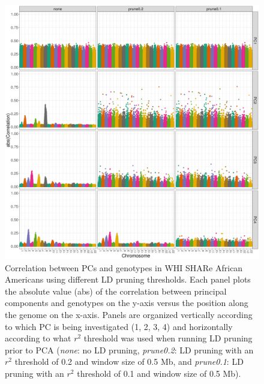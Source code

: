 \documentclass[12pt]{article}
\begin{document}
\begin{figure}[!htb]
\center
\includegraphics[width=\textwidth]{figs/pc_geno_corr/pc_geno_corr_compare_prune}
\caption{Correlation between PCs and genotypes in WHI SHARe African Americans using different LD pruning thresholds. Each panel plots the absolute value (abs) of the correlation between principal components and genotypes on the y-axis versus the position along the genome on the x-axis.  Panels are organized vertically according to which PC is being investigated (1, 2, 3, 4) and horizontally according to what $r^2$ threshold was used when running LD pruning prior to PCA (\textit{none}: no LD pruning, \textit{prune0.2}: LD pruning with an $r^2$ threshold of 0.2 and window size of 0.5 Mb, and \textit{prune0.1}: LD pruning with an $r^2$ threshold of 0.1 and window size of 0.5 Mb).}
\label{fig:corr-compare-prune}
\end{figure}
\end{document}
